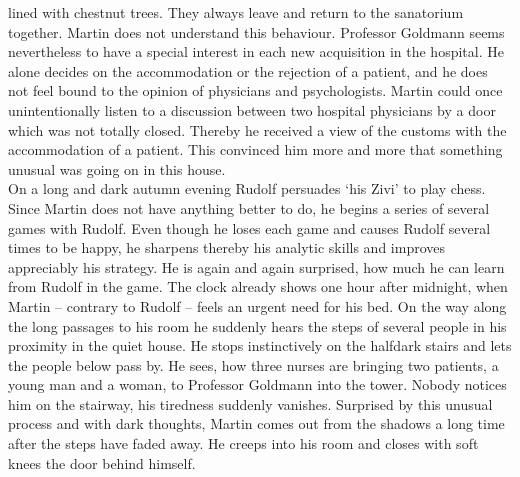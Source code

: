 lined with chestnut trees. 
They always leave and return to the sanatorium together.
Martin does not understand this behaviour. 
Professor Goldmann seems nevertheless to have a special interest in each new 
acquisition in the hospital. 
He alone decides on the accommodation or the rejection of a patient, and he does not 
feel bound to the opinion of physicians and psychologists. 
Martin could once unintentionally listen to a discussion between two hospital physicians 
by a door which was not totally closed. 
Thereby he received a view of the customs with the accommodation of a patient. 
This convinced him more and more that something unusual was going on in this house. 
\[\] 
On a long and dark autumn evening Rudolf persuades `his Zivi' to play chess. 
Since Martin does not have anything better to do, he begins a series of several 
games with Rudolf. 
Even though he loses each game and causes Rudolf several times to be happy, he 
sharpens thereby his analytic skills and improves appreciably his strategy. 
He is again and again surprised, how much he can learn from Rudolf in the game. 
The clock already shows one hour after midnight, when Martin -- contrary to Rudolf -- 
feels an urgent need for his bed.
On the way along the long passages to his room he suddenly hears the steps of 
several people in his proximity in the quiet house. 
He stops instinctively on the halfdark stairs and lets the people below pass by. 
He sees, how three nurses are bringing two patients, a young man and a woman, to 
Professor Goldmann into the tower. 
Nobody notices him on the stairway, his tiredness suddenly vanishes. 
Surprised by this unusual process and with dark thoughts, Martin comes out from the 
shadows a long time after the steps have faded away. 
He creeps into his room and closes with soft knees the door behind himself.


